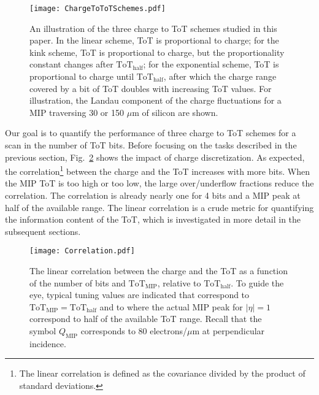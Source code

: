 \documentclass[12pt]{article}
\begin{document}
\begin{figure}[h!]
\centering
\texttt{[image: ChargeToToTSchemes.pdf]}
\caption{An illustration of the three charge to ToT schemes studied in this paper.  In the linear scheme, ToT is proportional to charge; for the kink scheme, ToT is proportional to charge, but the proportionality constant changes after $\text{ToT}_\text{half}$; for the exponential scheme, ToT is proportional to charge until $\text{ToT}_\text{half}$, after which the charge range covered by a bit of ToT doubles with increasing ToT values.  For illustration, the Landau component of the charge fluctuations for a MIP traversing 30 or 150 $\mu $m of silicon are shown.}
\label{fig:ChargeToToTSchemes.pdf}
\end{figure}

Our goal is to quantify the performance of three charge to ToT schemes for a scan in the number of ToT bits.  Before focusing on the tasks described in the previous section, Fig.~\ref{fig:correlation} shows the impact of charge discretization.   As expected, the correlation\footnote{The linear correlation is defined as the covariance divided by the product of standard deviations.} between the charge and the ToT increases with more bits.  When the MIP ToT is too high or too low, the large over/underflow fractions reduce the correlation.  The correlation is already nearly one for 4 bits and a MIP peak at half of the available range.  The linear correlation is a crude metric for quantifying the information content of the ToT, which is investigated in more detail in the subsequent sections.

\begin{figure}[h!]
\centering
\texttt{[image: Correlation.pdf]}
\caption{The linear correlation between the charge and the ToT as a function of the number of bits and $\text{ToT}_\text{MIP}$, relative to $\text{ToT}_\text{half}$.  To guide the eye, typical tuning values are indicated that correspond to $\text{ToT}_\text{MIP}=\text{ToT}_\text{half}$ and to where the actual MIP peak for $|\eta|=1$ correspond to half of the available ToT range.  Recall that the symbol $Q_\text{MIP}$ corresponds to 80 electrons/$\mu$m at perpendicular incidence.}
\label{fig:correlation}
\end{figure}


\clearpage
\end{document}
